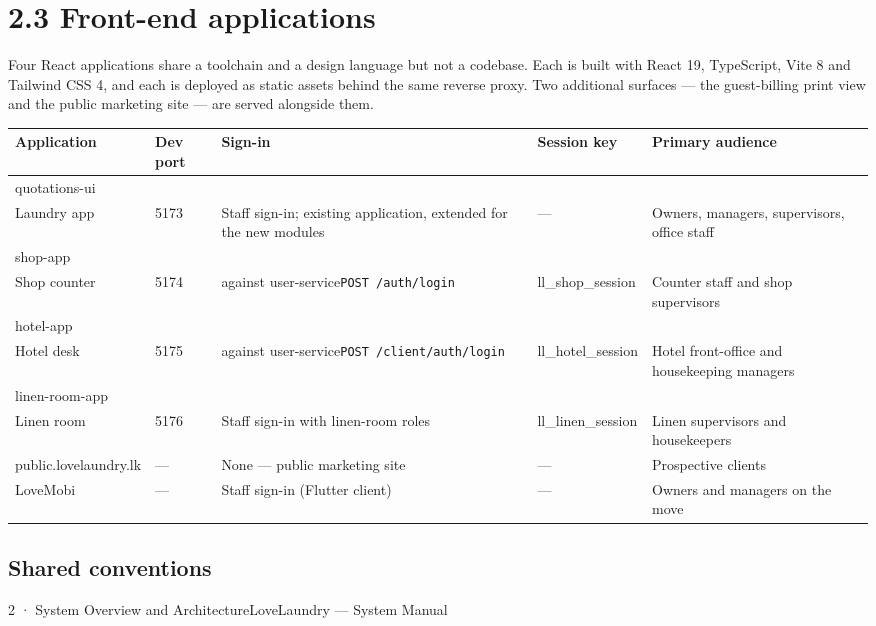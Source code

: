 \documentclass[11pt,a4paper,oneside]{book}
\begin{document}
\section{2.3 Front-end applications}
Four React applications share a toolchain and a design language but not a codebase. Each is built with React 19, TypeScript, Vite 8 and Tailwind CSS 4, and each is deployed as static assets behind the same reverse proxy. Two additional surfaces — the guest-billing print view and the public marketing site — are served alongside them.

\begin{center}\small
\begin{tabularx}{\linewidth}{|X|X|X|X|X|}
\hline
\rowcolor{lightgrey}
\textbf{Application} & \textbf{Dev port} & \textbf{Sign-in} & \textbf{Session key} & \textbf{Primary audience} \\ \hline
quotations-ui \\ Laundry app & 5173 & Staff sign-in; existing application, extended for the new modules & — & Owners, managers, supervisors, office staff \\ \hline
shop-app \\ Shop counter & 5174 & against user-service\texttt{POST /auth/login} & ll\_shop\_session & Counter staff and shop supervisors \\ \hline
hotel-app \\ Hotel desk & 5175 & against user-service\texttt{POST /client/auth/login} & ll\_hotel\_session & Hotel front-office and housekeeping managers \\ \hline
linen-room-app \\ Linen room & 5176 & Staff sign-in with linen-room roles & ll\_linen\_session & Linen supervisors and housekeepers \\ \hline
public.lovelaundry.lk & — & None — public marketing site & — & Prospective clients \\ \hline
LoveMobi & — & Staff sign-in (Flutter client) & — & Owners and managers on the move \\ \hline
\end{tabularx}
\end{center}
\subsection*{Shared conventions}
2 · System Overview and ArchitectureLoveLaundry — System Manual
\end{document}
